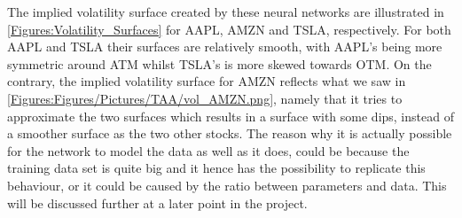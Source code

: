 \begin{table}[H]
    \centering
    \hfill
    \hfill
    \hfill
    \caption{MSE, MAE and MAPE the the test set of AAPL, AMZN and TSLA.}
    \label{Tab:APP:MSE MAE MAPE}
\end{table}

The implied volatility surface created by these neural networks are illustrated in \autoref{Figures:Volatility_Surfaces} for AAPL, AMZN and TSLA, respectively. For both AAPL and TSLA their surfaces are relatively smooth, with AAPL's being more symmetric around ATM whilst TSLA's is more skewed towards OTM. On the contrary, the implied volatility surface for AMZN reflects what we saw in \autoref{Figures:Figures/Pictures/TAA/vol_AMZN.png}, namely that it tries to approximate the two surfaces which results in a surface with some dips, instead of a smoother surface as the two other stocks. The reason why it is actually possible for the network to model the data as well as it does, could be because the training data set is quite big and it hence has the possibility to replicate this behaviour, or it could be caused by the ratio between parameters and data. This will be discussed further at a later point in the project. 


